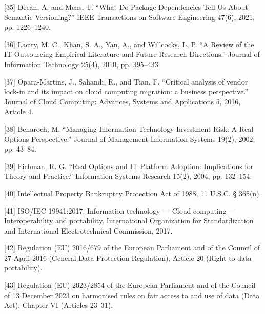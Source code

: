 \documentclass[11pt]{article}
\begin{document}
{[}35{]} Decan, A. and Mens, T. ``What Do Package Dependencies Tell Us About Semantic Versioning?'' IEEE Transactions on Software Engineering 47(6), 2021, pp. 1226--1240.

{[}36{]} Lacity, M. C., Khan, S. A., Yan, A., and Willcocks, L. P. ``A Review of the IT Outsourcing Empirical Literature and Future Research Directions.'' Journal of Information Technology 25(4), 2010, pp. 395--433.

{[}37{]} Opara-Martins, J., Sahandi, R., and Tian, F. ``Critical analysis of vendor lock-in and its impact on cloud computing migration: a business perspective.'' Journal of Cloud Computing: Advances, Systems and Applications 5, 2016, Article 4.

{[}38{]} Benaroch, M. ``Managing Information Technology Investment Risk: A Real Options Perspective.'' Journal of Management Information Systems 19(2), 2002, pp. 43--84.

{[}39{]} Fichman, R. G. ``Real Options and IT Platform Adoption: Implications for Theory and Practice.'' Information Systems Research 15(2), 2004, pp. 132--154.

{[}40{]} Intellectual Property Bankruptcy Protection Act of 1988, 11 U.S.C. § 365(n).

{[}41{]} ISO/IEC 19941:2017. Information technology --- Cloud computing --- Interoperability and portability. International Organization for Standardization and International Electrotechnical Commission, 2017.

{[}42{]} Regulation (EU) 2016/679 of the European Parliament and of the Council of 27 April 2016 (General Data Protection Regulation), Article 20 (Right to data portability).

{[}43{]} Regulation (EU) 2023/2854 of the European Parliament and of the Council of 13 December 2023 on harmonised rules on fair access to and use of data (Data Act), Chapter VI (Articles 23--31).
\end{document}
